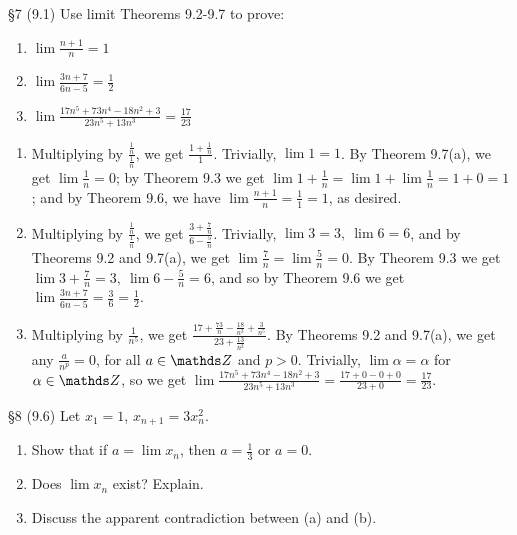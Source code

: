 \documentclass{homework}
\begin{document}
\begin{problem}{\S 7}
  (9.1) Use limit Theorems 9.2-9.7 to prove:
  \begin{enumerate}[label=(\alph*)]
    \item $\lim{\frac{n+1}{n}}=1$
    \item $\lim{\frac{3n+7}{6n-5}}=\frac{1}{2}$
    \item $\lim{\frac{17n^{5}+73n^{4}-18n^2+3}{23n^{5}+13n^3}}=\frac{17}{23}$
  \end{enumerate}
\end{problem}
\begin{solution}
  \begin{enumerate}[label=(\alph*)]
    \item 
      Multiplying by $\frac{\frac{1}{n}}{\frac{1}{n}}$, we get $\frac{1+\frac{1}{n}}{1}$. Trivially,
      $\lim{1}=1$. By Theorem 9.7(a), we get $\lim{\frac{1}{n}}=0$; by Theorem 9.3 we get
      $\lim{1+\frac{1}{n}}=\lim{1}+\lim{\frac{1}{n}}=1+0=1$; and by Theorem 9.6, we have
      $\lim{\frac{n+1}{n}}=\frac{1}{1}=1$, as desired.
    \item
      Multiplying by $\frac{\frac{1}{n}}{\frac{1}{n}}$, we get
      $\frac{3+\frac{7}{n}}{6-\frac{5}{n}}$. Trivially, $\lim{3}=3,\ \lim{6}=6$, and by Theorems 9.2
      and 9.7(a), we get $\lim{\frac{7}{n}}=\lim{\frac{5}{n}}=0$. By Theorem 9.3 we get
      $\lim{3+\frac{7}{n}}=3,\ \lim{6-\frac{5}{n}}=6$, and so by Theorem 9.6 we get 
      $\lim{\frac{3n+7}{6n-5}}=\frac{3}{6}=\frac{1}{2}$.
    \item Multiplying by $\frac{1}{n^{5}}$, we get
      $\frac{17+\frac{73}{n}-\frac{18}{n^3}+\frac{3}{n^{5}}}{23+\frac{13}{n^2}}$. By Theorems 9.2
      and 9.7(a), we get any $\frac{a}{n^{p}}=0$, for all $a\in \Z$ and $p>0$. Trivially,
      $\lim{\alpha}=\alpha$ for $\alpha\in \Z$, so we get
      $\lim{\frac{17n^{5}+73n^{4}-18n^2+3}{23n^{5}+13n^3}}=\frac{17+0-0+0}{23+0}=\frac{17}{23}$.
  \end{enumerate}
\end{solution}

\begin{problem}{\S 8}
    (9.6) Let $x_1=1$, $x_{n+1}=3x_n^2$.
    \begin{enumerate}[label=(\alph*)]
      \item Show that if $a=\lim{x_n}$, then $a=\frac{1}{3}$ or $a=0$.
      \item Does $\lim{x_n}$ exist? Explain.
      \item Discuss the apparent contradiction between (a) and (b).
    \end{enumerate}
\end{problem}
\end{document}
